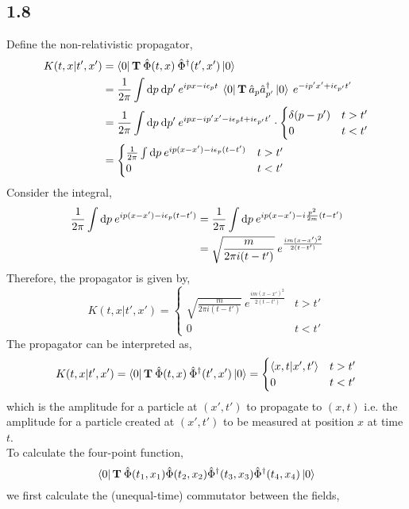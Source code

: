 \documentclass[12pt]{extarticle}
\begin{document}
\subsection*{1.8}
Define the non-relativistic propagator, 
\begin{align*}
K(t,x|t',x') & = \left< 0 \right| \mathbf{T} \: \hat{\Phi}(t, x) \: \hat{\Phi}^\dagger(t', x') \left| 0 \right>
\\
& = \frac{1}{2 \pi} \int \mathrm{d}p \: \mathrm{d}p' \: e^{i p x - i \epsilon_p t}  \: \left< 0 \right| \mathbf{T} \: \hat{a}_p \hat{a}^\dagger_{p'} \left| 0 \right> \: e^{- i p' x' + i \epsilon_{p'} t'} 
\\
& = \frac{1}{2 \pi} \int \mathrm{d}p \: \mathrm{d}p' \: e^{i p x - i p' x' - i \epsilon_p t + i \epsilon_{p'} t'} \cdot
\begin{cases}
\delta(p - p') & t > t'\\
0  & t < t'
\end{cases}
\\
& = 
\begin{cases}
\frac{1}{2 \pi} \int \mathrm{d}p \: e^{i p (x - x') - i \epsilon_p (t - t')} & t > t' \\
0 & t < t'
\end{cases}
\end{align*}
Consider the integral,
\begin{align*}
\frac{1}{2 \pi} \int \mathrm{d}p \: e^{i p (x - x') - i \epsilon_p (t - t')} & = \frac{1}{2 \pi} \int \mathrm{d}p \: e^{i p (x - x') - i \frac{p^2}{2m} (t - t')}
\\
& = \sqrt{\frac{m}{2 \pi i(t - t')}} \: e^{\frac{i m (x - x')^2}{2 (t - t')}}
\end{align*}
Therefore, the propagator is given by,
\[ K(t, x | t', x') = 
\begin{cases}
\sqrt{\frac{m}{2 \pi i(t - t')}} \: e^{\frac{i m (x - x')^2}{2 (t - t')}}  & t > t' \\
0 & t < t'
\end{cases}
\]
The propagator can be interpreted as, 
\[K(t, x| t', x') = \left< 0 \right| \mathbf{T} \: \hat{\Phi}(t, x) \: \hat{\Phi}^\dagger(t', x') \left| 0 \right>
=
\begin{cases}
\left< x, t | x', t' \right> & t > t'\\
0 & t < t'
\end{cases}
\]
which is the amplitude for a particle at $(x', t')$ to propagate to $(x, t)$ i.e. the amplitude for a particle created at $(x', t')$ to be measured at position $x$ at time $t$. \bigskip \\
To calculate the four-point function,
\[\left< 0 \right| \mathbf{T} \: \hat{\Phi}(t_1, x_1) \hat{\Phi}(t_2, x_2) \hat{\Phi}^\dagger(t_3, x_3) \hat{\Phi}^\dagger(t_4, x_4) \left| 0 \right>\]
we first calculate the (unequal-time) commutator between the fields,
\end{document}
